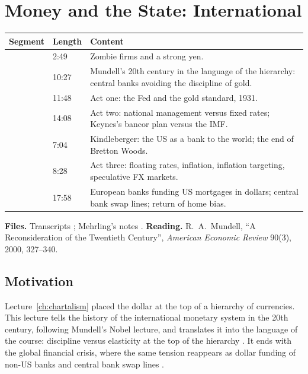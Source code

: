 \chapter{Money and the State: International}\label{ch:intl}
\begin{paracol}{2}

\begin{sources}
\begin{tabularx}{\linewidth}{@{}l l L@{}}
\toprule
\textbf{Segment} & \textbf{Length} & \textbf{Content}\\
\midrule
{} & 2:49 & Zombie firms and a strong yen.\\
 & 10:27 & Mundell's 20th century in the language of the hierarchy: central banks avoiding the discipline of gold.\\
 & 11:48 & Act one: the Fed and the gold standard, 1931.\\
 & 14:08 & Act two: national management versus fixed rates; Keynes's bancor plan versus the IMF.\\
 & 7:04 & Kindleberger: the US as a bank to the world; the end of Bretton Woods.\\
 & 8:28 & Act three: floating rates, inflation, inflation targeting, speculative FX markets.\\
 & 17:58 & European banks funding US mortgages in dollars; central bank swap lines; return of home bias.\\
\bottomrule
\end{tabularx}

\smallskip
\textbf{Files.} Transcripts ; Mehrling's notes .
\textbf{Reading.} R.~A.~Mundell, ``A Reconsideration of the Twentieth Century'', \emph{American Economic Review} 90(3), 2000, 327--340.
\end{sources}

\section*{Motivation}
Lecture~\ref{ch:chartalism} placed the dollar at the top of a hierarchy of currencies. This lecture tells the history of the international monetary system in
the 20th century, following Mundell's Nobel lecture, and translates it into the language of the course: discipline versus elasticity at the top of the
hierarchy . It ends with the global financial crisis, where the same tension reappears as dollar funding of non-US banks and
central bank swap lines .


\end{paracol}
